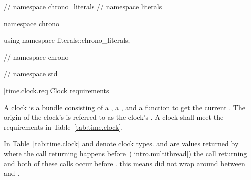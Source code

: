 \begin{codeblock}
{{{}  // namespace chrono_literals
}  // namespace literals

namespace chrono {

using namespace literals::chrono_literals;

} // namespace chrono

}  // namespace std
\end{codeblock}

[time.clock.req]{Clock requirements}

\pnum
A clock is a bundle consisting of a , a
, and a function  to get the current .
The origin of the clock's  is referred to as the clock's .
 A clock shall meet the requirements in Table~\ref{tab:time.clock}.

\pnum
In Table~\ref{tab:time.clock}  and  denote clock types.  and
 are values returned by  where the call returning  happens
before~(\ref{intro.multithread}) the call returning  and both of these calls
occur
before .
\enternote this means  did not wrap around between  and
. \exitnote

